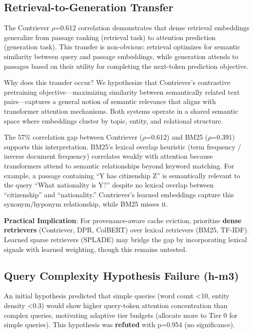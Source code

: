 \subsection{Retrieval-to-Generation Transfer}

The Contriever $\rho$=0.612 correlation demonstrates that dense retrieval embeddings generalize from passage ranking (retrieval task) to attention prediction (generation task). This transfer is non-obvious: retrieval optimizes for semantic similarity between query and passage embeddings, while generation attends to passages based on their utility for completing the next-token prediction objective.

Why does this transfer occur? We hypothesize that Contriever's contrastive pretraining objective—maximizing similarity between semantically related text pairs—captures a general notion of semantic relevance that aligns with transformer attention mechanisms. Both systems operate in a shared semantic space where embeddings cluster by topic, entity, and relational structure.

The 57\% correlation gap between Contriever ($\rho$=0.612) and BM25 ($\rho$=0.391) supports this interpretation. BM25's lexical overlap heuristic (term frequency / inverse document frequency) correlates weakly with attention because transformers attend to semantic relationships beyond keyword matching. For example, a passage containing ``Y has citizenship Z'' is semantically relevant to the query ``What nationality is Y?'' despite no lexical overlap between ``citizenship'' and ``nationality.'' Contriever's learned embeddings capture this synonym/hyponym relationship, while BM25 misses it.

\textbf{Practical Implication}: For provenance-aware cache eviction, prioritize \textbf{dense retrievers} (Contriever, DPR, ColBERT) over lexical retrievers (BM25, TF-IDF). Learned sparse retrievers (SPLADE) may bridge the gap by incorporating lexical signals with learned weighting, though this remains untested.

\subsection{Query Complexity Hypothesis Failure (h-m3)}

An initial hypothesis predicted that simple queries (word count <10, entity density <0.3) would show higher query-token attention concentration than complex queries, motivating adaptive tier budgets (allocate more to Tier 0 for simple queries). This hypothesis was \textbf{refuted} with p=0.954 (no significance).

